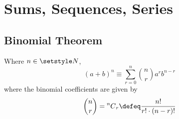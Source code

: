 \section{Sums, Sequences, Series}

\subsection{Binomial Theorem}

\begin{theorem} \label{thm_binomial_thm}
 Where \(n \in \Naturals\),
 \begin{equation*}
  (a + b)^n \equiv \sum_{r = 0}^n \binom nr a^r b^{n - r}
 \end{equation*}
 where the binomial coefficients are given by
 \begin{equation*}
  \binom nr = \nCr nr \defeq \frac{n!}{r!\cdot(n - r)!}
 \end{equation*}
\end{theorem}

